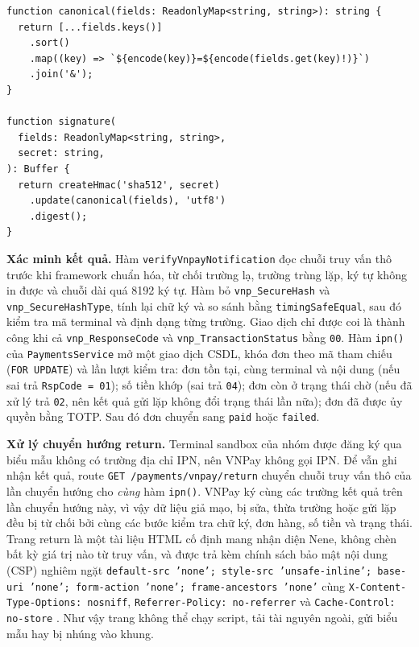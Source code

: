 \begin{lstlisting}[caption={Chuẩn hóa và ký tham số VNPay (\texttt{backend/\allowbreak{}src/\allowbreak{}payments/\allowbreak{}vnpay.\allowbreak{}ts})},label={lst:ch3-vnpay}]
function canonical(fields: ReadonlyMap<string, string>): string {
  return [...fields.keys()]
    .sort()
    .map((key) => `${encode(key)}=${encode(fields.get(key)!)}`)
    .join('&');
}

function signature(
  fields: ReadonlyMap<string, string>,
  secret: string,
): Buffer {
  return createHmac('sha512', secret)
    .update(canonical(fields), 'utf8')
    .digest();
}
\end{lstlisting}

\textbf{Xác minh kết quả.} Hàm \texttt{verify\allowbreak{}Vnpay\allowbreak{}Notification} đọc chuỗi truy vấn thô trước khi framework chuẩn hóa, từ chối trường lạ, trường trùng lặp, ký tự không in được và chuỗi dài quá 8192 ký tự. Hàm bỏ \texttt{vnp\_\allowbreak{}SecureHash} và \texttt{vnp\_\allowbreak{}Secure\allowbreak{}Hash\allowbreak{}Type}, tính lại chữ ký và so sánh bằng \texttt{timing\allowbreak{}Safe\allowbreak{}Equal}, sau đó kiểm tra mã terminal và định dạng từng trường. Giao dịch chỉ được coi là thành công khi cả \texttt{vnp\_\allowbreak{}ResponseCode} và \texttt{vnp\_\allowbreak{}Transaction\allowbreak{}Status} bằng \texttt{00}. Hàm \texttt{ipn()} của \texttt{Payments\allowbreak{}Service} mở một giao dịch CSDL, khóa đơn theo mã tham chiếu (\texttt{FOR UPDATE}) và lần lượt kiểm tra: đơn tồn tại, cùng terminal và nội dung (nếu sai trả \texttt{RspCode = 01}); số tiền khớp (sai trả \texttt{04}); đơn còn ở trạng thái chờ (nếu đã xử lý trả \texttt{02}, nên kết quả gửi lặp không đổi trạng thái lần nữa); đơn đã được ủy quyền bằng TOTP. Sau đó đơn chuyển sang \texttt{paid} hoặc \texttt{failed}.

\textbf{Xử lý chuyển hướng return.} Terminal sandbox của nhóm được đăng ký qua biểu mẫu không có trường địa chỉ IPN, nên VNPay không gọi IPN. Để vẫn ghi nhận kết quả, route \texttt{GET /\allowbreak{}payments/\allowbreak{}vnpay/\allowbreak{}return} chuyển chuỗi truy vấn thô của lần chuyển hướng cho \emph{cùng} hàm \texttt{ipn()}. VNPay ký cùng các trường kết quả trên lần chuyển hướng này, vì vậy dữ liệu giả mạo, bị sửa, thừa trường hoặc gửi lặp đều bị từ chối bởi cùng các bước kiểm tra chữ ký, đơn hàng, số tiền và trạng thái. Trang return là một tài liệu HTML cố định mang nhận diện Nene, không chèn bất kỳ giá trị nào từ truy vấn, và được trả kèm chính sách bảo mật nội dung (CSP) nghiêm ngặt \texttt{default-\allowbreak{}src 'none'; style-\allowbreak{}src 'unsafe-\allowbreak{}inline'; base-\allowbreak{}uri 'none'; form-\allowbreak{}action 'none'; frame-\allowbreak{}ancestors 'none'} cùng \texttt{X-\allowbreak{}Content-\allowbreak{}Type-\allowbreak{}Options: nosniff}, \texttt{Referrer-\allowbreak{}Policy: no-\allowbreak{}referrer} và \texttt{Cache-\allowbreak{}Control: no-\allowbreak{}store} \parencite{ch3-mdn-csp}. Như vậy trang không thể chạy script, tải tài nguyên ngoài, gửi biểu mẫu hay bị nhúng vào khung.


